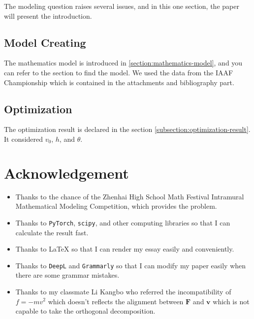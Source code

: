 \documentclass{article}
\begin{document}
The modeling question raises several issues, and in this one section, the paper will present the introduction.

\subsection{Model Creating}

The mathematics model is introduced in \ref{section:mathematics-model}, and you can refer to the section to find the model. We used the data from the IAAF Championship which is contained in the attachments and bibliography part.

\subsection{Optimization}

The optimization result is declared in the section \ref{subsection:optimization-result}. It considered $v_0$, $h$, and $\theta$.

\section{Acknowledgement}

\begin{itemize}
    \item Thanks to the chance of the Zhenhai High School Math Festival Intramural Mathematical Modeling Competition, which provides the problem.
    \item Thanks to \texttt{PyTorch}, \texttt{scipy}, and other computing libraries so that I can calculate the result fast.
    \item Thanks to \LaTeX{} so that I can render my essay easily and conveniently.
    \item Thanks to \texttt{DeepL} and \texttt{Grammarly} so that I can modify my paper easily when there are some grammar mistakes.
    \item Thanks to my classmate Li Kangbo who referred the incompatibility of $f=-mv^2$ which doesn't reflects the alignment between $\boldsymbol{F}$ and $\boldsymbol{v}$ which is not capable to take the orthogonal decomposition.
\end{itemize}
\end{document}
